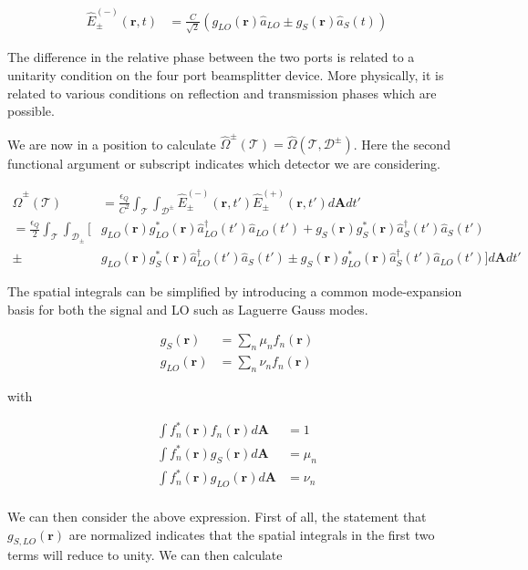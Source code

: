 \documentclass[12pt]{article}
\newcommand{\ep}{\epsilon}
\newcommand{\bv}[1]{\boldsymbol{#1}}
\newcommand{\mc}[1]{\mathcal{#1}}
\begin{document}
\begin{align}
\hat{E}^{(-)}_{\pm}(\bv{r}, t) &= \frac{C}{\sqrt{2}}\left(g_{LO}(\bv{r})\hat{a}_{LO} \pm g_S(\bv{r})\hat{a}_S(t) \right)
\end{align}

The difference in the relative phase between the two ports is related to a unitarity condition on the four port beamsplitter device. More physically, it is related to various conditions on reflection and transmission phases which are possible.

We are now in a position to calculate $\hat{\Omega}^{\pm}(\mc{T}) = \hat{\Omega}(\mc{T}, \mc{D}^{\pm})$. Here the second functional argument or subscript indicates which detector we are considering.

\begin{align}
\hat{\Omega}^{\pm}(\mc{T}) &= \frac{\ep_Q}{C^2}\int_{\mc{T}}\int_{\mc{D}^{\pm}} \hat{E}^{(-)}_{\pm}(\bv{r}, t')\hat{E}^{(+)}_{\pm}(\bv{r}, t')d\bv{A}dt'\\
=\frac{\ep_Q}{2} \int_{\mc{T}}\int_{\mc{D_{\pm}}} \Big[
&g_{LO}(\bv{r})g^*_{LO}(\bv{r})\hat{a}^{\dag}_{LO}(t')\hat{a}_{LO}(t')
+g_{S}(\bv{r})g^*_{S}(\bv{r})\hat{a}^{\dag}_{S}(t')\hat{a}_S(t')\\
\pm &g_{LO}(\bv{r})g^*_{S}(\bv{r})\hat{a}^{\dag}_{LO}(t')\hat{a}_S(t')
\pm g_{S}(\bv{r})g^*_{LO}(\bv{r})\hat{a}^{\dag}_{S}(t')\hat{a}_{LO}(t')
\Big]d\bv{A}dt'
\end{align}

The spatial integrals can be simplified by introducing a common mode-expansion basis for both the signal and LO such as Laguerre Gauss modes.

\begin{align}
g_S(\bv{r}) &= \sum_n \mu_n f_n(\bv{r})\\
g_{LO}(\bv{r}) &= \sum_n \nu_n f_n(\bv{r})
\end{align}

with

\begin{align}
\int f_n^*(\bv{r})f_n(\bv{r})d\bv{A} &= 1\\
\int f_n^*(\bv{r})g_S(\bv{r}) d\bv{A} &= \mu_n\\
\int f_n^*(\bv{r})g_{LO}(\bv{r}) d\bv{A} &= \nu_n\\
\end{align}


We can then consider the above expression. First of all, the statement that $g_{S,LO}(\bv{r})$ are normalized indicates that the spatial integrals in the first two terms will reduce to unity. We can then calculate
\end{document}
